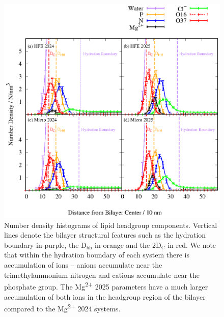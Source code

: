 \documentclass[journal=langd5,manuscript=article]{achemso}
\newcommand{\mg}{Mg\textsuperscript{2+}}
\newcommand{\dhh}{$\text{D}_\text{hh}$}
\newcommand{\dc}{$\text{2D}_\text{C}$}
\begin{document}
\begin{figure}[H]
    \includegraphics{figures/Figure_5.eps}
    \caption{Number density histograms of lipid headgroup components. Vertical lines denote the bilayer structural features such as the hydration boundary in purple, the \dhh{} in orange and the \dc{} in red. We note
    that within the hydration boundary of each system there is accumulation of ions -- anions accumulate near the trimethylammonium nitrogen and cations accumulate near the phosphate group. The \mg{ 2025} parameters
have a much larger accumulation of both ions in the headgroup region of the bilayer compared to the \mg{ 2024} systems.}
    \label{fig:soldens}
\end{figure}
\end{document}
